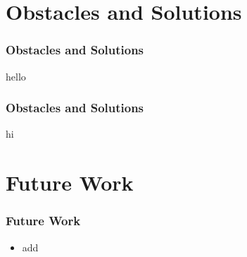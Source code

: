 \documentclass{beamer}
\begin{document}
\section{Obstacles and Solutions }
\begin{frame}
\frametitle{Obstacles and Solutions}
hello
\end{frame}

\begin{frame}
\frametitle{Obstacles and Solutions}
hi
\end{frame}

\section{Future Work}
\begin{frame}
\frametitle{Future Work}
\begin{itemize}
\item add
\end{itemize}
\end{frame}
\end{document}
